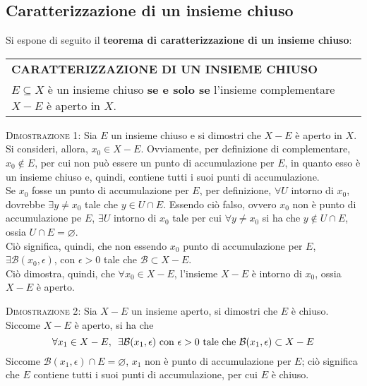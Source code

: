 \documentclass[a4paper]{extarticle}
\renewcommand\arraystretch{}
\begin{document}
\vspace{1em}
\subsection{Caratterizzazione di un insieme chiuso}
Si espone di seguito il \textbf{teorema di caratterizzazione di un insieme chiuso}:

\vspace{1em}
\setlength{\tabcolsep}{14pt}
\renewcommand{\arraystretch}{2}
\noindent
\begin{tabularx}{\textwidth}{@{}|P|@{}}
    \hline
    {\textbf{CARATTERIZZAZIONE DI UN INSIEME CHIUSO}}\\
    \parbox{\linewidth}{$E \subseteq X$ è un insieme chiuso \textbf{se e solo se} l'insieme complementare $X-E$ è aperto in $X$.
    \vspace{3mm}}\\
    \hline
\end{tabularx}

\vspace{2em}
\noindent
\normalfont \normalsize
\textsc{Dimostrazione 1}: Sia $E$ un insieme chiuso e si dimostri che $X-E$ è aperto in $X$.\\
Si consideri, allora, $x_0 \in X-E$. Ovviamente, per definizione di complementare, $x_0 \notin E$, per cui non può essere un punto di accumulazione per $E$, in quanto esso è un insieme chiuso e, quindi, contiene tutti i suoi punti di accumulazione.\\
Se $x_0$ fosse un punto di accumulazione per $E$, per definizione, $\forall U$ intorno di $x_0$, dovrebbe $\exists y \neq x_0$ tale che $y \in U \cap E$. Essendo ciò falso, ovvero $x_0$ non è punto di accumulazione pe $E$, $\exists U$ intorno di $x_0$ tale per cui $\forall y \neq x_0$ si ha che $y \notin U \cap E$, ossia $U \cap E = \varnothing$.\\
Ciò significa, quindi, che non essendo $x_0$ punto di accumulazione per $E$, $\exists \mathcal{B}(x_0,\epsilon)$, con $\epsilon>0$ tale che $\mathcal{B} \subset X - E$.\\
Ciò dimostra, quindi, che $\forall x_0 \in X-E$, l'insieme $X-E$ è intorno di $x_0$, ossia $X-E$ è aperto.

\vspace{2em}
\noindent
\normalfont \normalsize
\textsc{Dimostrazione 2}: Sia $X - E$ un insieme aperto, si dimostri che $E$ è chiuso.\\
Siccome $X-E$ è aperto, si ha che
\[\forall x_1 \in X - E, \hspace{0.5em} \exists \mathcal{B}(x_1,\epsilon) \text{ con } \epsilon>0 \text{ tale che } \mathcal{B}(x_1,\epsilon) \subset X - E\]
Siccome $\mathcal{B}(x_1,\epsilon) \cap E = \varnothing$, $x_1$ non è punto di accumulazione per $E$; ciò significa che $E$ contiene tutti i suoi punti di accumulazione, per cui $E$ è chiuso.
\end{document}
